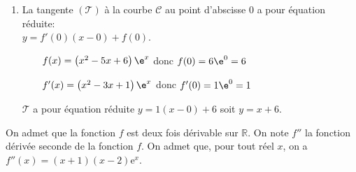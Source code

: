 \begin{enumerate}
\begin{center}
{
\renewcommand{\arraystretch}{1.5}
\def\esp{\hspace*{2cm}}
$\begin{array}{|c | *{7}{c} |} 
\hline
x  & -\infty & \esp & \frac{3-\sqrt{5}}{2} & \esp & \frac{3+\sqrt{5}}{2} & \esp & +\infty \\
\hline
x^2-3x+1 &  & \pmb{+} &  \vline\hspace{-2.7pt}{0} & \pmb{-} & \vline\hspace{-2.7pt}{0} & \pmb{+} &\\
\hline
\e^x &  & \pmb{+} &  \vline\hspace{-2.7pt}{\phantom 0} & \pmb{+} & \vline\hspace{-2.7pt}{\phantom 0} & \pmb{+} &\\
\hline
f'(x) &  & \pmb{+} &  \vline\hspace{-2.7pt}{0} & \pmb{-} & \vline\hspace{-2.7pt}{0} & \pmb{+} & \\
\hline
f &  & \text{croissante} &  \vline\hspace{-2.7pt}{\phantom 0} & \text{décroissante} & \vline\hspace{-2.7pt}{\phantom 0} & \text{croissante} & \\
\hline
\end{array}$
}
\end{center}


\item La tangente $(\mathcal{T})$ à la courbe $\mathcal{C}$ au point d'abscisse 0 a pour équation réduite: \\
$y=f'(0)\left (x-0\right ) + f(0)$.

~~\textbullet~~$f(x)=\left (x^2-5x+6\right )\e^{x}$ donc $f(0)=6\e^{0}=6$

~~\textbullet~~$f'(x)=\left (x^2-3x+1\right )\e^{x}$ donc $f'(0)=1\e^{0}=1$

$\mathcal{T}$ a pour équation réduite $y=1\left (x-0\right )+6$ soit $y=x+6$.

\end{enumerate}

On admet que la fonction $f$ est deux fois dérivable sur $\mathbb{R}$. On note $f''$ la fonction dérivée seconde de la fonction $f$. On admet que, pour tout réel $x$, on a $f''(x) = (x + 1)(x - 2) \mathrm{e}^{x}$.

